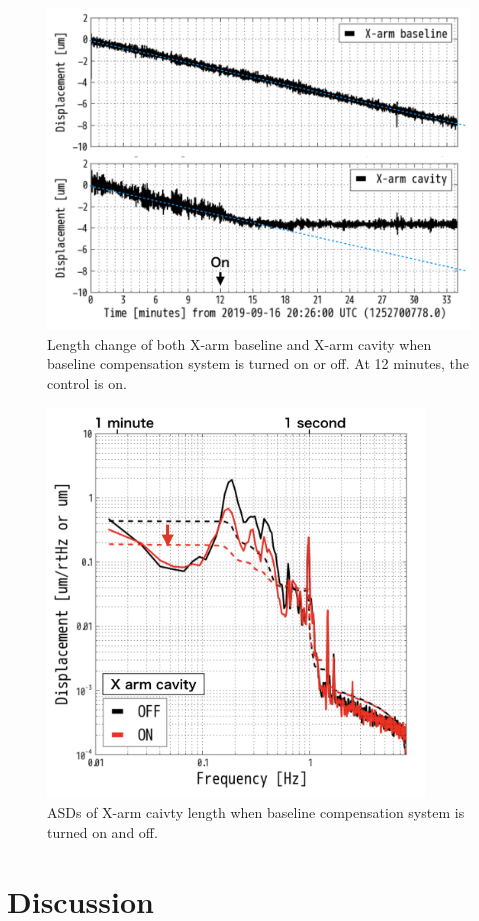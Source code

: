 \begin{figure}[h]
  \centering
  \includegraphics[width=12cm]{./img_chap6/img610.png}
  \caption{Length change of both X-arm baseline and X-arm cavity when baseline compensation system is turned on or off. At 12 minutes, the control is on.}\label{img:img610}
\end{figure}
\begin{figure}[H]
  \centering
  \includegraphics[width=10cm]{./img_chap6/img611.png}
  \caption{ASDs of X-arm caivty length when baseline compensation system is turned on and off. }\label{img:img611}
\end{figure}

\section{Discussion}

